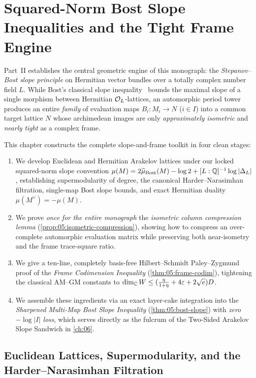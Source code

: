 \chapter{Squared-Norm Bost Slope Inequalities and the Tight Frame Engine}
\label{ch:05}

Part~II establishes the central geometric engine of this monograph: the \emph{Stepanov--Bost slope principle} on Hermitian vector bundles over a totally complex number field $L$. While Bost's classical slope inequality~\cite{Bost1996} bounds the maximal slope of a single morphism between Hermitian $\mathcal{O}_L$-lattices, an automorphic period tower produces an entire \emph{family} of evaluation maps $B_i : M_i \to N$ ($i \in I$) into a common target lattice $N$ whose archimedean images are only \emph{approximately isometric} and \emph{nearly tight} as a complex frame.

This chapter constructs the complete slope-and-frame toolkit in four clean stages:
\begin{enumerate}[label=(\roman*)]
\item We develop Euclidean and Hermitian Arakelov lattices under our locked squared-norm slope convention $\mu(M) = 2\widehat{\mu}_{\mathrm{Bost}}(M) - \log 2 + [L:\mathbb{Q}]^{-1}\log|\Delta_L|$, establishing supermodularity of degree, the canonical Harder--Narasimhan filtration, single-map Bost slope bounds, and exact Hermitian duality $\mu(M^\vee) = -\mu(M)$.
\item We prove \emph{once for the entire monograph} the \emph{isometric column compression lemma} (\cref{prop:05:isometric-compression}), showing how to compress an over-complete automorphic evaluation matrix while preserving both near-isometry and the frame trace-square ratio.
\item We give a ten-line, completely basis-free Hilbert--Schmidt Paley--Zygmund proof of the \emph{Frame Codimension Inequality} (\cref{thm:05:frame-codim}), tightening the classical AM--GM constants to $\dim_{\mathbb{C}} W \le (\frac{\eta}{1+\eta} + 4\varepsilon + 2\sqrt{e})D$.
\item We assemble these ingredients via an exact layer-cake integration into the \emph{Sharpened Multi-Map Bost Slope Inequality} (\cref{thm:05:bost-slope}) with \emph{zero $-\log|I|$ loss}, which serves directly as the fulcrum of the Two-Sided Arakelov Slope Sandwich in \cref{ch:06}.
\end{enumerate}

\section{Euclidean Lattices, Supermodularity, and the Harder--Narasimhan Filtration}
\label{sec:05:euclidean-hn}

